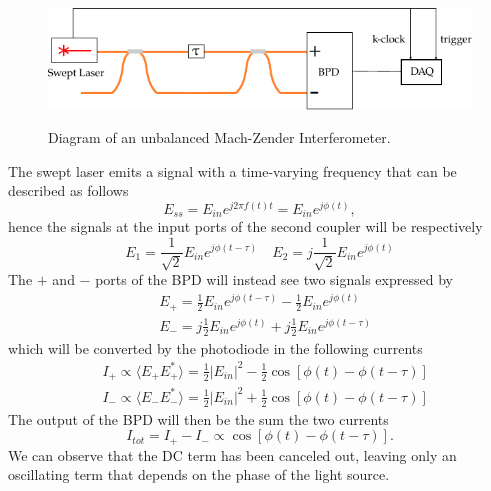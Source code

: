 \begin{figure}[bth]
	\myfloatalign
	{\includegraphics[width=\linewidth]{gfx/setup-diagrams/interferometer.pdf}}
	\caption{Diagram of an unbalanced Mach-Zender Interferometer.}\label{fig:unbalanced-mzi}
\end{figure}


The swept laser emits a signal with a time-varying frequency that can be described as follows
\begin{equation}
E_{ss} = E_{in} e^{j2\pi f(t) t} = E_{in}e^{j\phi(t)},
\end{equation}
hence the signals at the input ports of the second coupler will be respectively
\begin{equation}
	E_1 = \frac{1}{\sqrt{2}}E_{in} e^{j\phi(t-\tau)}\quad
	E_2 = j\frac{1}{\sqrt{2}}E_{in} e^{j\phi(t)}
\end{equation}
The $+$ and $-$ ports of the BPD will instead see two signals expressed by
\begin{align}
	&E_+ = \frac{1}{2}E_{in} e^{j\phi(t-\tau)} - \frac{1}{2}E_{in} e^{j\phi(t)}\\
	&E_- = j\frac{1}{2}E_{in} e^{j\phi(t)} + j \frac{1}{2}E_{in} e^{j\phi(t-\tau)}
\end{align}
which will be converted by the photodiode in the following currents
\begin{align}
	& I_+ \propto \langle E_+ E_+^* \rangle = \frac{1}{2}|E_{in}|^2 - \frac{1}{2}\cos\left[\phi(t)-\phi(t-\tau)\right]\\
	& I_- \propto \langle E_- E_-^* \rangle = \frac{1}{2}|E_{in}|^2 + \frac{1}{2}\cos\left[\phi(t)-\phi(t-\tau)\right]
\end{align}
The output of the BPD will then be the sum the two currents
\begin{equation}
	I_{tot} = I_+ - I_- \propto \cos\left[\phi(t)-\phi(t-\tau)\right].
\end{equation}
We can observe that the DC term has been canceled out, leaving only an oscillating term that depends on the phase of the light source. 


